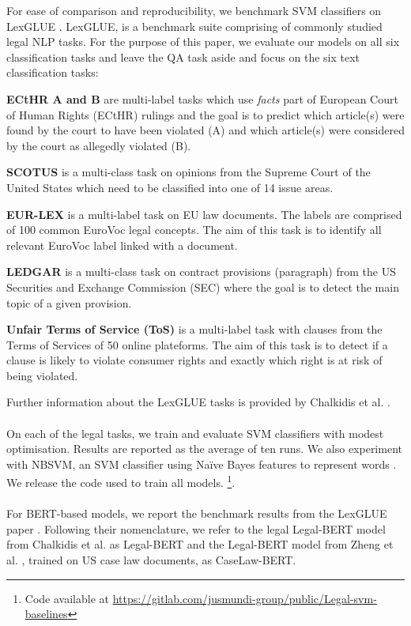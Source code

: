 \documentclass{IOS-Book-Article}
\begin{document}
For ease of comparison and reproducibility, we benchmark SVM classifiers on LexGLUE \cite{lexglue}. LexGLUE, is a benchmark suite comprising of commonly studied legal NLP tasks. For the purpose of this paper, we evaluate our models on all six classification tasks and leave the QA task aside and focus on the six text classification tasks:

\textbf{ECtHR A and B} \cite{echr, rationale} are multi-label tasks which use \textit{facts} part of European Court of Human Rights (ECtHR) rulings and the goal is to predict which article(s) were found by the court to have been violated (A) and which article(s) were considered by the court as allegedly violated (B).

\textbf{SCOTUS} \cite{lexglue} is a multi-class task on opinions from the Supreme Court of the United States which need to be classified into one of 14 issue areas.

\textbf{EUR-LEX} \cite{eurlex} is a multi-label task on EU law documents. The labels are comprised of 100 common EuroVoc legal concepts. The aim of this task is to identify all relevant EuroVoc label linked with a document.

\textbf{LEDGAR} \cite{ledgar} is a multi-class task on contract provisions (paragraph) from the US Securities and Exchange Commission (SEC) where the goal is to detect the main topic of a given provision.

\textbf{Unfair Terms of Service (ToS)} \cite{claudette} is a multi-label task with clauses from the Terms of Services of 50 online plateforms. The aim of this task is to detect if a clause is likely to violate consumer rights and exactly which right is at risk of being violated. 

Further information about the LexGLUE tasks is provided by Chalkidis et al. \cite{lexglue}.\\
\\
On each of the legal tasks, we train and evaluate SVM classifiers with modest optimisation. Results are reported as the average of ten runs. We also experiment with NBSVM, an SVM classifier using Naïve Bayes features to represent words \cite{nbsvm}. We release the code used to train all models. \footnote{Code available at \href{https://gitlab.com/jusmundi-group/public/Legal-svm-baselines}{https://gitlab.com/jusmundi-group/public/Legal-svm-baselines}}. \\
\\
For BERT-based models, we report the benchmark results from the LexGLUE paper \cite{lexglue}. Following their nomenclature, we refer to the legal Legal-BERT model from Chalkidis et al. \cite{legalbertacl} as Legal-BERT and the Legal-BERT model from Zheng et al. \cite{legalberticail}, trained on US case law documents, as CaseLaw-BERT.
\end{document}
